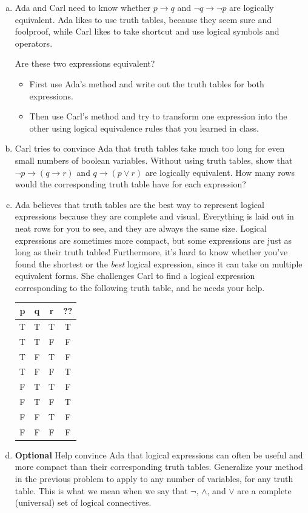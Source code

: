 \documentclass{article}
\begin{document}
\begin{enumerate}[(b)]
\item
Ada and Carl need to know whether $p \rightarrow q$ and $\lnot q \rightarrow \lnot p$
are logically equivalent. Ada likes to use truth tables, because they seem
sure and foolproof, while Carl likes to take shortcut and use
logical symbols and operators.

Are these two expressions equivalent?

\begin{itemize}
\item First use Ada's method and write out the truth tables for both expressions.
\item Then use Carl's method and try to transform one expression into the other using
logical equivalence rules that you learned in class.
\end{itemize}

\item
Carl tries to convince Ada that truth tables take much too long for
even small numbers of boolean variables. Without using truth tables,
show that $\lnot p \rightarrow (q \rightarrow r)$ and
$q \rightarrow (p \lor r)$ are logically equivalent. How many rows
would the corresponding truth table have for each expression?

\item
Ada believes that truth tables are the best way to represent
logical expressions because they are complete and visual. Everything
is laid out in neat rows for you to see, and they are always the
same size. Logical expressions are sometimes more compact,
but some expressions are just as long as their truth tables!
Furthermore, it's hard to know whether you've found the shortest
or the \emph{best} logical expression, since it can take on
multiple equivalent forms.
She challenges Carl to find a logical expression corresponding
to the following truth table, and he needs your help.

\begin{center}
\begin{tabular}{|ccc|c|}
\hline
p & q & r & ?? \\
\hline
T & T & T & T \\
T & T & F & F \\
T & F & T & F \\
T & F & F & T \\
F & T & T & F \\
F & T & F & T \\
F & F & T & F \\
F & F & F & F \\
\hline
\end{tabular}
\end{center}

\item
\textbf{Optional}
Help convince Ada that logical expressions can often be useful and
more compact than their corresponding truth tables. Generalize your
method in the previous problem to apply to any number of variables,
for any truth table. This is what we mean when we say that
$\lnot$, $\land$, and $\lor$ are a complete (universal) set
of logical connectives.
\end{enumerate}
\end{document}
